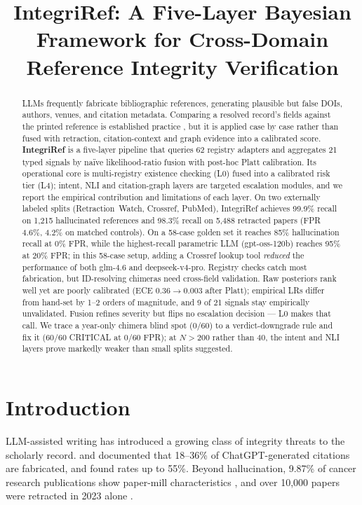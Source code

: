 \documentclass[letterpaper]{article} %
\title{IntegriRef: A Five-Layer Bayesian Framework for Cross-Domain Reference Integrity Verification}
\author{}
\begin{document}
\maketitle
\begin{abstract}
LLMs frequently fabricate bibliographic references, generating plausible but false DOIs, authors, venues, and citation metadata. Comparing a resolved record's fields against the printed reference is established practice \cite{dunford2024bibliography}, but it is applied case by case rather than fused with retraction, citation-context and graph evidence into a calibrated score.
\textbf{IntegriRef} is a five-layer pipeline that queries 62 registry adapters and aggregates 21 typed signals by na\"ive likelihood-ratio fusion with post-hoc Platt calibration. Its operational core is multi-registry existence checking (L0) fused into a calibrated risk tier (L4); intent, NLI and citation-graph layers are targeted escalation modules, and we report the empirical contribution and limitations of each layer. On two externally labeled splits (Retraction~Watch, Crossref, PubMed), IntegriRef achieves 99.9\% recall on 1{,}215 hallucinated references and 98.3\% recall on 5{,}488 retracted papers (FPR 4.6\%, 4.2\% on matched controls). On a 58-case golden set it reaches 85\% hallucination recall at 0\% FPR, while the highest-recall parametric LLM (gpt-oss-120b) reaches 95\% at 20\% FPR; in this 58-case setup, adding a Crossref lookup tool \emph{reduced} the performance of both glm-4.6 and deepseek-v4-pro.
Registry checks catch most fabrication, but ID-resolving chimeras need cross-field validation. Raw posteriors rank well yet are poorly calibrated (ECE 0.36$\to$0.003 after Platt); empirical LRs differ from hand-set by 1--2 orders of magnitude, and 9 of 21 signals stay empirically unvalidated. Fusion refines severity but flips no escalation decision --- L0 makes that call. We trace a year-only chimera blind spot (0/60) to a verdict-downgrade rule and fix it (60/60 CRITICAL at 0/60 FPR); at $N{>}200$ rather than 40, the intent and NLI layers prove markedly weaker than small splits suggested.

\end{abstract}
\section{Introduction}

LLM-assisted writing has introduced a growing class of integrity threats to the scholarly record. \citet{alkaissi2023artificial} and \citet{athaluri2023exploring} documented that 18--36\% of ChatGPT-generated citations are fabricated, and \citet{walters2023fabrication} found rates up to 55\%. Beyond hallucination, 9.87\% of cancer research publications show paper-mill characteristics \cite{scancar2026papermill}, and over 10,000 papers were retracted in 2023 alone \cite{oppenlaender2026retract}.
\end{document}
